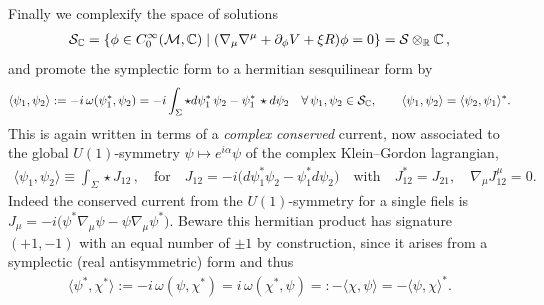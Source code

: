 \documentclass[../QFT_main.tex]{subfiles}
\begin{document}
\begin{mytheorem}
Finally we complexify the space of solutions 
\begin{align}
    \mathcal{S}_{\mathbb{C}} = \{ \phi \in C^\infty_0(\mathcal{M},\mathbb{C}) \mid (\nabla_\mu \nabla^\mu + \partial_\phi V + \xi R) \phi = 0 \} = \mathcal{S} \otimes_{\mathbb{R}} \mathbb{C}\,,
\end{align}
and promote the symplectic form to a hermitian sesquilinear form by 
\begin{align}
  \langle \psi_1, \psi_2\rangle := -i \,\omega(\psi^*_1, \psi_2) = -i\int_\Sigma \star d\psi_1^* \, \psi_2 - \psi_1^* \, \star d\psi_2
  \quad \forall\, \psi_1, \psi_2 \in \mathcal{S}_{\mathbb{C}}, \qquad \langle \psi_1, \psi_2\rangle = \langle \psi_2, \psi_1\rangle^*.
\end{align}
This is again written in terms of a \emph{complex} \emph{conserved} current, now associated to the global $U(1)$-symmetry $\psi \mapsto e^{i\alpha} \psi$ of the complex Klein--Gordon lagrangian,
\begin{align}
    \langle \psi_1, \psi_2\rangle \equiv \int_\Sigma \star J_{12}\,,\quad\text{for}\quad
    J_{12}= -i\big(d\psi_1^* \psi_2 - \psi_1^* d\psi_2\big)\quad \text{with} \quad J_{12}^* = J_{21}, \quad \nabla_\mu J^\mu_{12} = 0.
\end{align}
Indeed the conserved current from the $U(1)$-symmetry for a single fiels is $J_\mu = -i\big(\psi^* \nabla_\mu \psi - \psi \nabla_\mu \psi^*\big)$.
Beware this hermitian product has signature $(+1,-1)$ with an equal number of $\pm1$ by construction, since it arises from a symplectic (real antisymmetric) form and thus
\begin{align}\label{eq:signature_pm_hermitian_product_phase_space}
    \langle \psi^*,\chi^*\rangle := -i\, \omega(\psi, \chi^*) = i\, \omega(\chi^*, \psi) =: -\langle \chi, \psi \rangle = -\langle \psi, \chi\rangle^*.
\end{align}
\end{mytheorem}
\end{document}
